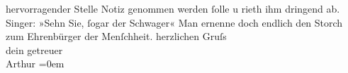 \begin{ledgroupsized}[t]{13cm}
                  her{\pb}vorragender
               Stelle Notiz genommen werden ſolle u rieth ihm dringend ab. Singer: »Sehn Sie, ſogar der Schwager«\pend
           \pstart
           Man ernenne doch endlich den Storch zum Ehrenbürger der Menſchheit.\pend
           \pstart
           herzlichen Gruſs{\\[\baselineskip]}dein getreuer{\\[\baselineskip]}\spacefill\mbox{Arthur}\pend
           \leftskip=0em{}
         
         \endnumbering{}\end{ledgroupsized}  \newcommand{\dateiname}{L01287}\newcommand{\titel}{Arthur Schnitzler an Hermann Bahr, 6. 4. 1903}\newcommand{\editorInnen}{ Kurt Ifkovits,  Martin Anton Müller}
      